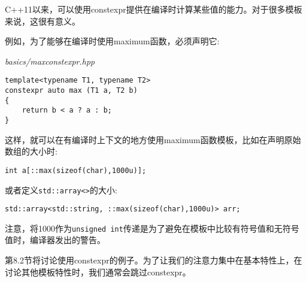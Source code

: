 
C++11以来，可以使用constexpr提供在编译时计算某些值的能力。对于很多模板来说，这很有意义。

例如，为了能够在编译时使用maximum函数，必须声明它:

\noindent
\textit{basics/maxconstexpr.hpp}
\begin{lstlisting}[style=styleCXX]
template<typename T1, typename T2>
constexpr auto max (T1 a, T2 b)
{
	return b < a ? a : b;
}
\end{lstlisting}

这样，就可以在有编译时上下文的地方使用maximum函数模板，比如在声明原始数组的大小时:

\begin{lstlisting}[style=styleCXX]
int a[::max(sizeof(char),1000u)];
\end{lstlisting}

或者定义\texttt{std::array<>}的大小:

\begin{lstlisting}[style=styleCXX]
std::array<std::string, ::max(sizeof(char),1000u)> arr;
\end{lstlisting}

注意，将1000作为\texttt{unsigned int}传递是为了避免在模板中比较有符号值和无符号值时，编译器发出的警告。

第8.2节将讨论使用constexpr的例子。为了让我们的注意力集中在基本特性上，在讨论其他模板特性时，我们通常会跳过constexpr。











